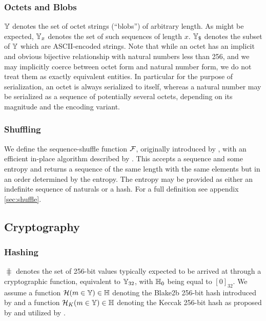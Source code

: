 \subsubsection{Octets and Blobs}

$\mathbb{Y}$ denotes the set of octet strings (``blobs'') of arbitrary length. As might be expected, $\mathbb{Y}_{x}$ denotes the set of such sequences of length $x$. $\mathbb{Y}_{\$}$ denotes the subset of $\mathbb{Y}$ which are ASCII-encoded strings. Note that while an octet has an implicit and obvious bijective relationship with natural numbers less than 256, and we may implicitly coerce between octet form and natural number form, we do not treat them as exactly equivalent entities. In particular for the purpose of serialization, an octet is always serialized to itself, whereas a natural number may be serialized as a sequence of potentially several octets, depending on its magnitude and the encoding variant.

\subsubsection{Shuffling}

We define the sequence-shuffle function $\mathcal{F}$, originally introduced by \cite{fisheryates1938statistical}, with an efficient in-place algorithm described by \cite{wikipedia2024fisheryates}. This accepts a sequence and some entropy and returns a sequence of the same length with the same elements but in an order determined by the entropy. The entropy may be provided as either an indefinite sequence of naturals or a hash. For a full definition see appendix \ref{sec:shuffle}.

\subsection{Cryptography}\label{sec:cryptography}

\subsubsection{Hashing}

$\hash$ denotes the set of 256-bit values typically expected to be arrived at through a cryptographic function, equivalent to $\mathbb{Y}_{32}$, with $\mathbb{H}_0$ being equal to $[0]_{32}$. We assume a function $\mathcal{H}(m \in \mathbb{Y}) \in \mathbb{H}$ denoting the Blake2b 256-bit hash introduced by \cite{rfc7693} and a function $\mathcal{H}_K(m \in \mathbb{Y}) \in \mathbb{H}$ denoting the Keccak 256-bit hash as proposed by \cite{bertoni2013keccak} and utilized by \cite{wood2014ethereum}.

